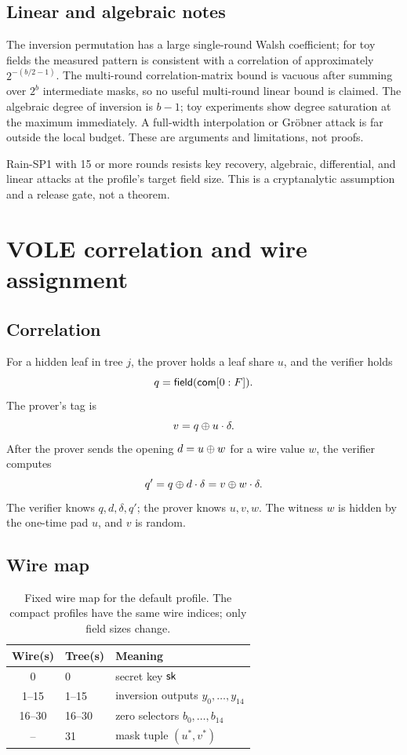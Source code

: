 \documentclass[11pt,a4paper]{article}
\begin{document}
\subsection{Linear and algebraic notes}

The inversion permutation has a large single-round Walsh coefficient; for
toy fields the measured pattern is consistent with a correlation of
approximately $2^{-(b/2-1)}$. The multi-round correlation-matrix bound is
vacuous after summing over $2^b$ intermediate masks, so no useful multi-round
linear bound is claimed. The algebraic degree of inversion is $b-1$; toy
experiments show degree saturation at the maximum immediately. A full-width
interpolation or Gr\"obner attack is far outside the local budget. These are
arguments and limitations, not proofs.

\begin{assumption}
Rain-SP1 with 15 or more rounds resists key recovery, algebraic, differential,
and linear attacks at the profile's target field size. This is a
cryptanalytic assumption and a release gate, not a theorem.
\end{assumption}

\section{VOLE correlation and wire assignment}
\label{sec:vole}

\subsection{Correlation}

For a hidden leaf in tree $j$, the prover holds a leaf share $u$, and the
verifier holds
\[
q=\mathsf{field}(\mathsf{com}[0:F]).
\]
The prover's tag is
\[
v=q\oplus u\cdot\delta.
\]
After the prover sends the opening $d=u\oplus w$ for a wire value $w$, the
verifier computes
\[
q'=q\oplus d\cdot\delta=v\oplus w\cdot\delta.
\]
The verifier knows $q,d,\delta,q'$; the prover knows $u,v,w$. The witness $w$
is hidden by the one-time pad $u$, and $v$ is random.

\subsection{Wire map}

\begin{table}[ht]
\centering
\small
\caption{Fixed wire map for the default profile. The compact profiles have the
same wire indices; only field sizes change.}
\label{tab:wires}
\begin{tabular}{@{}cll@{}}
\toprule
Wire(s) & Tree(s) & Meaning \\
\midrule
0 & 0 & secret key $\mathsf{sk}$ \\
1--15 & 1--15 & inversion outputs $y_0,\ldots,y_{14}$ \\
16--30 & 16--30 & zero selectors $b_0,\ldots,b_{14}$ \\
-- & 31 & mask tuple $(u^\ast,v^\ast)$ \\
\bottomrule
\end{tabular}
\end{table}
\end{document}
